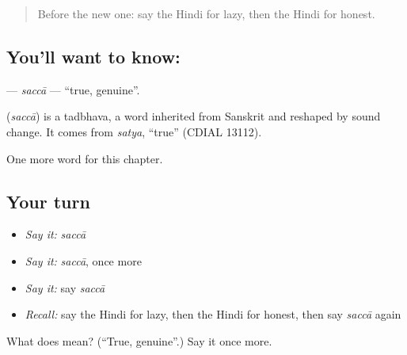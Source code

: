 \label{lesson:HI-C214-sacca}



\begin{quote}
Before the new one: say the Hindi for lazy, then the Hindi for honest.
\end{quote}

\subsection*{You'll want to know: }
\textbf{} — \emph{saccā} — \textquotedblleft{}true, genuine\textquotedblright{}.

\begin{cousinweb}
\textbf{} (\emph{saccā}) is a tadbhava, a word inherited from Sanskrit and reshaped by sound change. It comes from \emph{satya}, \textquotedblleft{}true\textquotedblright{} (CDIAL 13112).
\end{cousinweb}

\begin{grammarlens}[title={What you've built}]
One more word for this chapter.
\end{grammarlens}

\subsection*{Your turn}
\begin{itemize}
\raggedright
  \item \emph{Say it:} \emph{saccā}
  \item \emph{Say it:} \emph{saccā}, once more
  \item \emph{Say it:} say \emph{saccā}
  \item \emph{Recall:} say the Hindi for lazy, then the Hindi for honest, then say \emph{saccā} again
\end{itemize}

\begin{tcolorbox}[breakable,colback=teal!4,colframe=teal!35!black,title={Before you move on}]
What does  mean? (\textquotedblleft{}True, genuine\textquotedblright{}.) Say it once more.
\end{tcolorbox}
